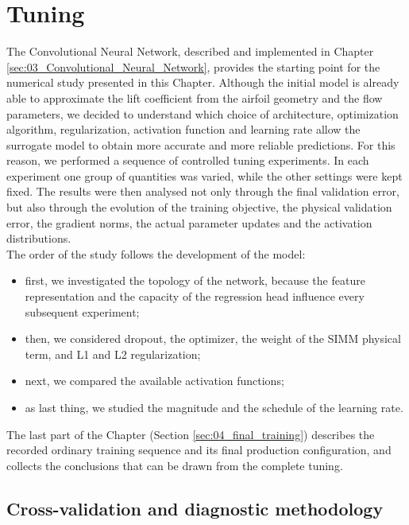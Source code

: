 \section{Tuning}
\label{sec:04_Tuning}

The Convolutional Neural Network, described and implemented in Chapter \ref{sec:03_Convolutional_Neural_Network}, provides the starting point for the numerical study presented in this Chapter. Although the initial model is already able to approximate the lift coefficient from the airfoil geometry and the flow parameters, we decided to understand which choice of architecture, optimization algorithm, regularization, activation function and learning rate allow the surrogate model to obtain more accurate and more reliable predictions. For this reason, we performed a sequence of controlled tuning experiments. In each experiment one group of quantities was varied, while the other settings were kept fixed. The results were then analysed not only through the final validation error, but also through the evolution of the training objective, the physical validation error, the gradient norms, the actual parameter updates and the activation distributions.\\

The order of the study follows the development of the model:
\begin{itemize}
    \item[-] first, we investigated the topology of the network, because the feature representation and the capacity of the regression head influence every subsequent experiment;
    \item[-] then, we considered dropout, the optimizer, the weight of the SIMM physical term, and L1 and L2 regularization;
    \item[-] next, we compared the available activation functions;
    \item[-] as last thing, we studied the magnitude and the schedule of the learning rate.
\end{itemize}
The last part of the Chapter (Section \ref{sec:04_final_training}) describes the recorded ordinary training sequence and its final production configuration, and collects the conclusions that can be drawn from the complete tuning.

\subsection{Cross-validation and diagnostic methodology}
\label{sec:04_cross_validation}

